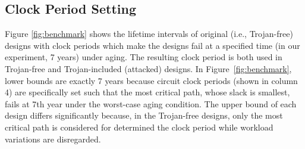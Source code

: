\subsection{Clock Period Setting}
\label{sec:exp:tc}
Figure \ref{fig:benchmark} shows the lifetime intervals of original (i.e., Trojan-free) designs with clock periods which make the designs fail at a specified time (in our experiment, 7 years) under aging. The resulting clock period is both used in Trojan-free and Trojan-included (attacked) designs. In Figure~\ref{fig:benchmark}, lower bounds are exactly 7 years because circuit clock periods (shown in column 4) are specifically set such that the most critical path, whose slack is smallest, fails at 7th year under the worst-case aging condition. The upper bound of each design differs significantly because, in the Trojan-free designs, only the most critical path is considered for determined the clock period while workload variations are disregarded.



